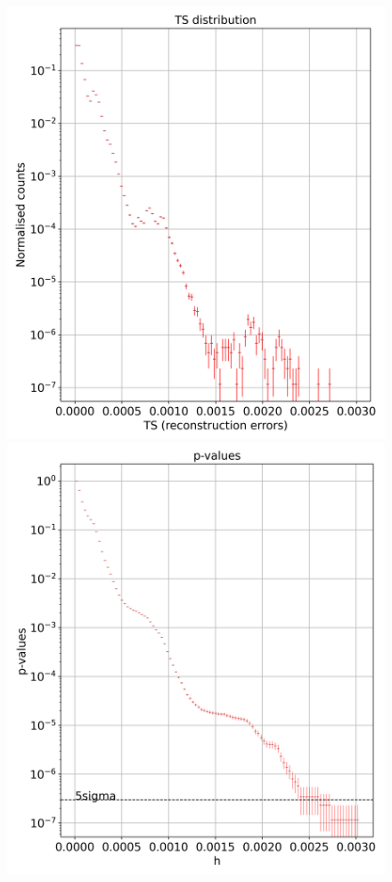 \begin{figure}[!htb]
    \centering
    \begin{minipage}{0.5\textwidth}
        \centering
        \includegraphics[width=\linewidth]{figures/experiments/p_val/model_7/ts_distribution_bins_100.png}
    \end{minipage}%
    \begin{minipage}{0.5\textwidth}
        \centering
       \includegraphics[width=\linewidth]{figures/experiments/p_val/model_7/pvalue_bins_100.png}

\end{minipage}
\end{figure}
